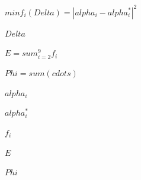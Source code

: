 
$min f_i(Delta)=|alpha_i-alpha_i^*|^2$

$Delta$

$E=sum_{i=2}^{9} f_i$

$Phi=sum(cdots)$

$alpha_i$

$alpha_i^*$

$f_i$

$E$

$Phi$
